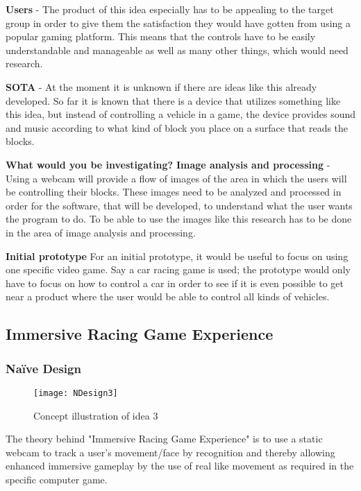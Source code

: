 \noindent\textbf{Users} - The product of this idea especially has to be appealing to the target group in order to give them the satisfaction they would have gotten from using a popular gaming platform. This means that the controls have to be easily understandable and manageable as well as many other things, which would need research.
\bigskip

\noindent\textbf{SOTA} - At the moment it is unknown if there are ideas like this already developed. So far it is known that there is a device that utilizes something like this idea, but instead of controlling a vehicle in a game, the device provides sound and music according to what kind of block you place on a surface that reads the blocks.
\bigskip

\noindent\textbf{What would you be investigating?} \newline
\noindent\textbf{Image analysis and processing} - 
Using a webcam will provide a flow of images of the area in which the users will be controlling their blocks. These images need to be analyzed and processed in order for the software, that will be developed, to understand what the user wants the program to do. To be able to use the images like this research has to be done in the area of image analysis and processing.
\bigskip

\noindent\textbf{Initial prototype} \newline
For an initial prototype, it would be useful to focus on using one specific video game. Say a car racing game is used; the prototype would only have to focus on how to control a car in order to see if it is even possible to get near a product where the user would be able to control all kinds of vehicles.

\pagebreak

\subsection{Immersive Racing Game Experience} \label{nd3}
\subsubsection*{Naïve Design}
\begin{figure}[h]
\centering
\texttt{[image: NDesign3]}
\caption{Concept illustration of idea 3}
\label{fig:ndesign3}
\end{figure}
The theory behind "Immersive Racing Game Experience" is to use a static webcam to track a user's movement/face by recognition and thereby allowing enhanced immersive gameplay by the use of real like movement as required in the specific computer game.


